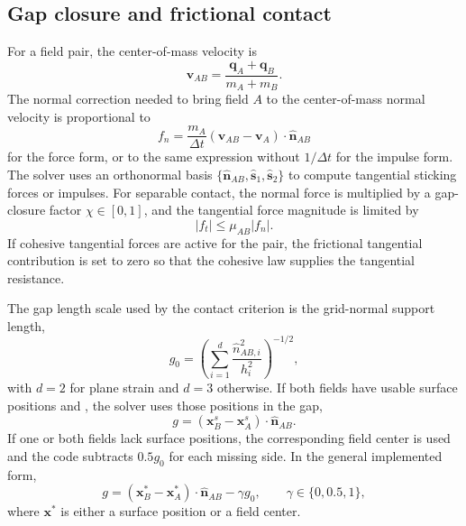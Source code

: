 \subsection{Gap closure and frictional contact}
\label{subsec:contact-gap-closure}

For a field pair, the center-of-mass velocity is
\begin{equation}
  \mathbf{v}_{AB}=\frac{\mathbf{q}_A+\mathbf{q}_B}{m_A+m_B}.
\end{equation}
The normal correction needed to bring field $A$ to the center-of-mass normal velocity is proportional to
\begin{equation}
  f_n=\frac{m_A}{\Delta t}\left(\mathbf{v}_{AB}-\mathbf{v}_A\right)\cdot\hat{\mathbf{n}}_{AB}
  \label{eq:contact-normal-force-core}
\end{equation}
for the force form, or to the same expression without $1/\Delta t$ for the impulse form.  The solver uses an orthonormal basis $\{\hat{\mathbf{n}}_{AB},\hat{\mathbf{s}}_1,\hat{\mathbf{s}}_2\}$ to compute tangential sticking forces or impulses.  For separable contact, the normal force is multiplied by a gap-closure factor $\chi\in[0,1]$, and the tangential force magnitude is limited by
\begin{equation}
  |f_t|\le \mu_{AB}|f_n|.
\end{equation}
If cohesive tangential forces are active for the pair, the frictional tangential contribution is set to zero so that the cohesive law supplies the tangential resistance.

The gap length scale used by the contact criterion is the grid-normal support length,
\begin{equation}
  g_0 = \left(\sum_{i=1}^{d}\frac{\hat n_{AB,i}^{2}}{h_i^2}\right)^{-1/2},
  \label{eq:contact-gap0}
\end{equation}
with $d=2$ for plane strain and $d=3$ otherwise.  If both fields have usable surface positions and , the solver uses those positions in the gap,
\begin{equation}
  g=(\mathbf{x}^{s}_B-\mathbf{x}^{s}_A)\cdot\hat{\mathbf{n}}_{AB}.
\end{equation}
If one or both fields lack surface positions, the corresponding field center is used and the code subtracts $0.5g_0$ for each missing side.  In the general implemented form,
\begin{equation}
  g=(\mathbf{x}^{*}_B-\mathbf{x}^{*}_A)\cdot\hat{\mathbf{n}}_{AB}-\gamma g_0,
  \qquad \gamma\in\{0,0.5,1\},
  \label{eq:contact-gap-general}
\end{equation}
where $\mathbf{x}^{*}$ is either a surface position or a field center.

